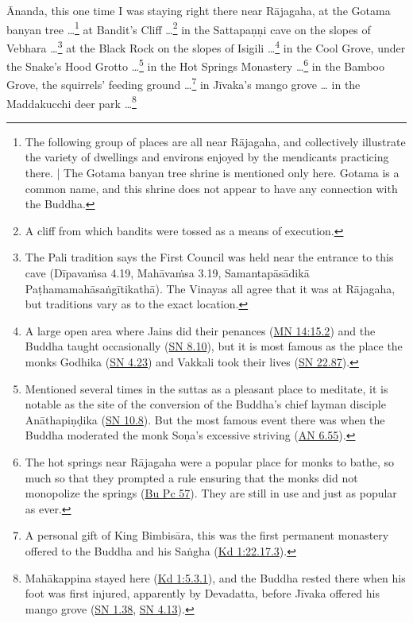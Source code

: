 \documentclass[12pt,openany]{book}%
\begin{document}
Ānanda, this one time I was staying right there near \textsanskrit{Rājagaha}, at the Gotama banyan tree …\footnote{The following group of places are all near \textsanskrit{Rājagaha}, and collectively illustrate the variety of dwellings and environs enjoyed by the mendicants practicing there. | The Gotama banyan tree shrine is mentioned only here. Gotama is a common name, and this shrine does not appear to have any connection with the Buddha. } at Bandit’s Cliff …\footnote{A cliff from which bandits were tossed as a means of execution. } in the \textsanskrit{Sattapaṇṇi} cave on the slopes of Vebhara …\footnote{The Pali tradition says the First Council was held near the entrance to this cave  (\textsanskrit{Dīpavaṁsa} 4.19, \textsanskrit{Mahāvaṁsa} 3.19, \textsanskrit{Samantapāsādikā} \textsanskrit{Paṭhamamahāsaṅgītikathā}). The Vinayas all agree that it was at \textsanskrit{Rājagaha}, but traditions vary as to the exact location. } at the Black Rock on the slopes of Isigili …\footnote{A large open area where Jains did their penances (\href{https://suttacentral.net/mn14/en/sujato\#15.2}{MN 14:15.2}) and the Buddha taught occasionally (\href{https://suttacentral.net/sn8.10/en/sujato}{SN 8.10}), but it is most famous as the place the monks Godhika (\href{https://suttacentral.net/sn4.23/en/sujato}{SN 4.23}) and Vakkali took their lives (\href{https://suttacentral.net/sn22.87/en/sujato}{SN 22.87}). } in the Cool Grove, under the Snake’s Hood Grotto …\footnote{Mentioned several times in the suttas as a pleasant place to meditate, it is notable as the site of the conversion of the Buddha’s chief layman disciple \textsanskrit{Anāthapiṇḍika} (\href{https://suttacentral.net/sn10.8/en/sujato}{SN 10.8}). But the most famous event there was when the Buddha moderated the monk \textsanskrit{Soṇa}’s excessive striving (\href{https://suttacentral.net/an6.55/en/sujato}{AN 6.55}). } in the Hot Springs Monastery …\footnote{The hot springs near \textsanskrit{Rājagaha} were a popular place for monks to bathe, so much so that they prompted a rule ensuring that the monks did not monopolize the springs (\href{https://suttacentral.net/pli-tv-bu-vb-pc57/en/sujato}{Bu Pc 57}). They are still in use and just as popular as ever. } in the Bamboo Grove, the squirrels’ feeding ground …\footnote{A personal gift of King \textsanskrit{Bimbisāra}, this was the first permanent monastery offered to the Buddha and his \textsanskrit{Saṅgha} (\href{https://suttacentral.net/pli-tv-kd1/en/sujato\#22.17.3}{Kd 1:22.17.3}). } in \textsanskrit{Jīvaka}’s mango grove … in the Maddakucchi deer park …\footnote{\textsanskrit{Mahākappina} stayed here (\href{https://suttacentral.net/pli-tv-kd1/en/sujato\#5.3.1}{Kd 1:5.3.1}), and the Buddha rested there when his foot was first injured, apparently by Devadatta, before \textsanskrit{Jīvaka} offered his mango grove (\href{https://suttacentral.net/sn1.38/en/sujato}{SN 1.38}, \href{https://suttacentral.net/sn4.13/en/sujato}{SN 4.13}). } 
\end{document}
